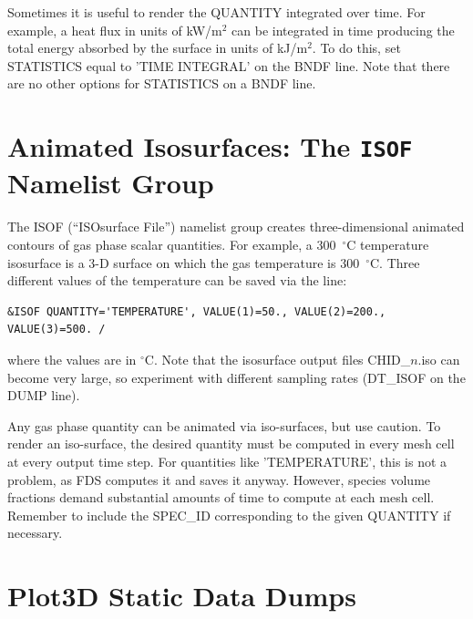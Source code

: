 \documentclass[11pt]{book}
\begin{document}
Sometimes it is useful to render the {\ct QUANTITY} integrated over time. For example, a heat flux in units of kW/m$^2$ can be integrated in time producing the total energy absorbed by the surface in units of kJ/m$^2$. To do this, set {\ct STATISTICS} equal to {\ct 'TIME INTEGRAL'} on the {\ct BNDF} line. Note that there are no other options for {\ct STATISTICS} on a {\ct BNDF} line.



\section{Animated Isosurfaces: The \texorpdfstring{{\tt ISOF}}{ISOF} Namelist Group}
\label{info:ISOF}

The {\ct ISOF} (``ISOsurface File'') namelist group creates three-dimensional animated contours of gas phase scalar quantities. For example, a 300~$^\circ$C temperature isosurface is a 3-D surface on which the gas temperature is 300~$^\circ$C. Three different values of the temperature can be saved via the line:
\begin{lstlisting}
&ISOF QUANTITY='TEMPERATURE', VALUE(1)=50., VALUE(2)=200., VALUE(3)=500. /
\end{lstlisting}
where the values are in $^\circ$C. Note that the isosurface output files {\ct CHID\_$n$.iso} can become very large, so experiment with different sampling rates ({\ct DT\_ISOF} on the {\ct DUMP} line).

Any gas phase quantity can be animated via iso-surfaces, but use caution. To render an iso-surface, the desired quantity must be computed in every mesh cell at every output time step. For quantities like {\ct 'TEMPERATURE'}, this is not a problem, as FDS computes it and saves it anyway. However, species volume fractions demand substantial amounts of time to compute at each mesh cell. Remember to include the {\ct SPEC\_ID} corresponding to the given {\ct QUANTITY} if necessary.




\section{Plot3D Static Data Dumps}
\label{info:PL3D}
\end{document}
